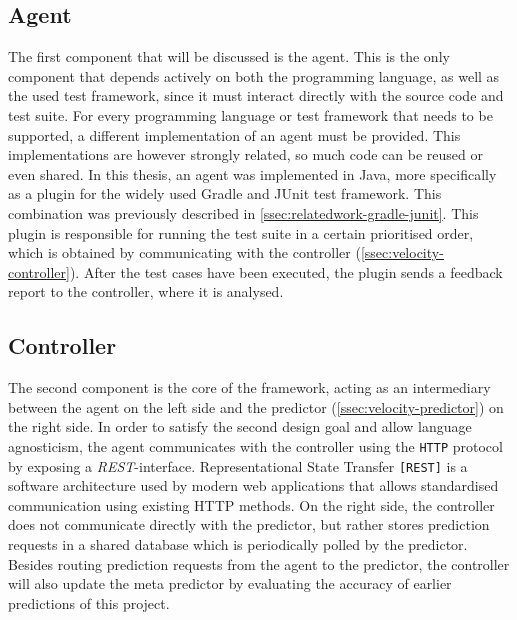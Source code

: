 \subsection{Agent}\label{ssec:velocity-frontend}
The first component that will be discussed is the agent. This is the only component that depends actively on both the programming language, as well as the used test framework, since it must interact directly with the source code and test suite. For every programming language or test framework that needs to be supported, a different implementation of an agent must be provided. This implementations are however strongly related, so much code can be reused or even shared. In this thesis, an agent was implemented in Java, more specifically as a plugin for the widely used Gradle and JUnit test framework. This combination was previously described in \autoref{ssec:relatedwork-gradle-junit}. This plugin is responsible for running the test suite in a certain prioritised order, which is obtained by communicating with the controller (\autoref{ssec:velocity-controller}). After the test cases have been executed, the plugin sends a feedback report to the controller, where it is analysed.

\subsection{Controller}\label{ssec:velocity-controller}
The second component is the core of the framework, acting as an intermediary between the agent on the left side and the predictor (\autoref{ssec:velocity-predictor}) on the right side. In order to satisfy the second design goal and allow language agnosticism, the agent communicates with the controller using the \texttt{HTTP} protocol by exposing a \emph{REST}-interface. Representational State Transfer \texttt{[REST]} is a software architecture used by modern web applications that allows standardised communication using existing HTTP methods. On the right side, the controller does not communicate directly with the predictor, but rather stores prediction requests in a shared database which is periodically polled by the predictor. Besides routing prediction requests from the agent to the predictor, the controller  will also update the meta predictor by evaluating the accuracy of earlier predictions of this project.

